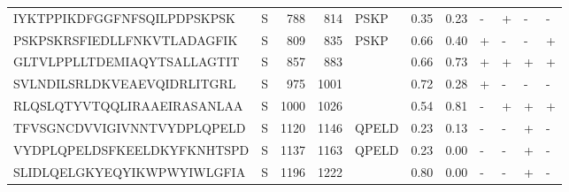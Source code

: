 \begin{tabular}{llrrlrrllll}
IYKTPPIKDFGGFNFSQILPDPSKPSK &       S &    788 &   814 &               PSKP &            0.35 &             0.23 &      - &       + &      - &       - \\
PSKPSKRSFIEDLLFNKVTLADAGFIK &       S &    809 &   835 &               PSKP &            0.66 &             0.40 &      + &       - &      - &       + \\
GLTVLPPLLTDEMIAQYTSALLAGTIT &       S &    857 &   883 &                    &            0.66 &             0.73 &      + &       + &      + &       + \\
SVLNDILSRLDKVEAEVQIDRLITGRL &       S &    975 &  1001 &                    &            0.72 &             0.28 &      + &       - &      - &       - \\
RLQSLQTYVTQQLIRAAEIRASANLAA &       S &   1000 &  1026 &                    &            0.54 &             0.81 &      - &       + &      + &       + \\
TFVSGNCDVVIGIVNNTVYDPLQPELD &       S &   1120 &  1146 &              QPELD &            0.23 &             0.13 &      - &       - &      + &       - \\
VYDPLQPELDSFKEELDKYFKNHTSPD &       S &   1137 &  1163 &              QPELD &            0.23 &             0.00 &      - &       - &      + &       - \\
SLIDLQELGKYEQYIKWPWYIWLGFIA &       S &   1196 &  1222 &                    &            0.80 &             0.00 &      - &       - &      + &       - \\
\bottomrule
\end{tabular}

